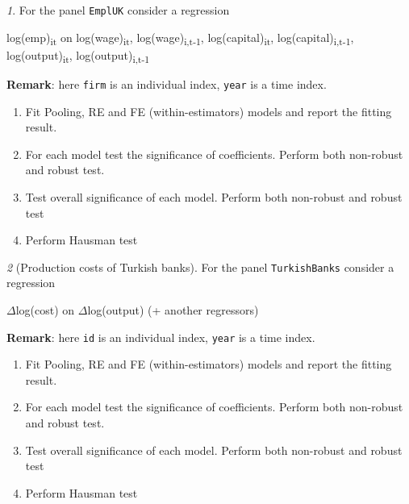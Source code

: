 \documentclass[12pt]{article}
\theoremstyle{remark}
\newtheorem{exercise}{}[section]
\begin{document}
\begin{exercise}
For the panel \texttt{EmplUK} consider a regression
\begin{center}
	log(emp)\textsubscript{it} on log(wage)\textsubscript{it}, log(wage)\textsubscript{i,t-1}, 
	log(capital)\textsubscript{it}, log(capital)\textsubscript{i,t-1},
	log(output)\textsubscript{it}, log(output)\textsubscript{i,t-1}  
\end{center}
\textbf{Remark}: here \texttt{firm} is an individual index, 
\texttt{year} is a time index.
\begin{enumerate}
	\item Fit Pooling, RE and FE (within-estimators) models
	and report the fitting result.
	\item For each model test the significance of coefficients. Perform both
	non-robust and robust test.
	\item Test overall significance of each model. Perform both
	non-robust and robust test
	\item Perform Hausman test
\end{enumerate}
\end{exercise}

\begin{exercise}[Production costs of Turkish banks]
For the panel \texttt{TurkishBanks} consider a regression
\begin{center}
	\(\Delta\)log(cost) on \(\Delta\)log(output) (+ another regressors)  
\end{center}
\textbf{Remark}: here \texttt{id} is an individual index, 
\texttt{year} is a time index.
\begin{enumerate}
	\item Fit Pooling, RE and FE (within-estimators) models
	and report the fitting result.
	\item For each model test the significance of coefficients. Perform both
	non-robust and robust test.
	\item Test overall significance of each model. Perform both
	non-robust and robust test
	\item Perform Hausman test
\end{enumerate}
\end{exercise}
\end{document}
